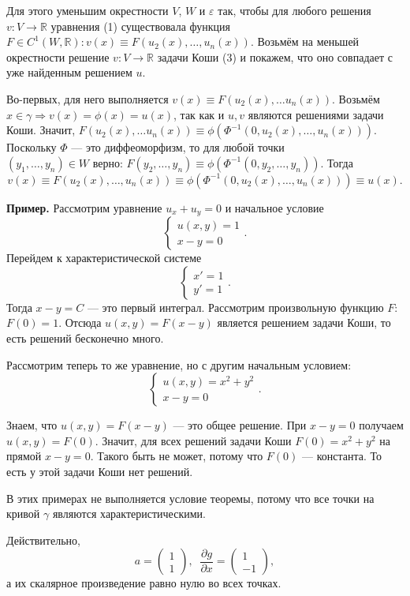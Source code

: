 Для этого уменьшим окрестности $V$, $W$ и $\varepsilon$ так, чтобы для любого решения $v \colon V \to \mathbb{R}$ уравнения (1) существовала функция $F \in C^1(W, \mathbb{R}) : v(x) \equiv F(u_2(x), \dots, u_n(x))$.
Возьмём на меньшей окрестности решение $v \colon V \to \mathbb{R}$ задачи Коши (3) и покажем, что оно совпадает с уже найденным решением $u$.

Во-первых, для него выполняется $v(x) \equiv F(u_2(x), \dots u_n(x))$. Возьмём $x \in \gamma \Rightarrow v(x) = \phi(x) = u(x)$, так как и $u, v$ являются решениями задачи Коши. Значит, $F(u_2(x), \dots u_n(x)) \equiv \phi(\Phi^{-1}(0, u_2(x), \dots, u_n(x)))$.
Поскольку $\Phi$ --- это диффеоморфизм, то для любой точки\\$(y_1, \dots, y_n) \in W$ верно: $F(y_2, \dots, y_n) \equiv \phi(\Phi^{-1}(0, y_2, \dots, y_n)).$
Тогда $$v(x) \equiv F(u_2(x), \dots, u_n(x)) \equiv \phi(\Phi^{-1}(0, u_2(x), \dots, u_n(x))) \equiv u(x).$$

\QED

\textbf{Пример.} Рассмотрим уравнение $u_x + u_y = 0$ и начальное условие
$$
\begin{cases}
  u(x, y) = 1\\
  x-y = 0
\end{cases}.
$$
Перейдем к характеристической системе 
$$
 \begin{cases}
    x' = 1\\
    y' = 1
 \end{cases}.
$$
Тогда $x - y = C$ --- это первый интеграл. Рассмотрим произвольную функцию $F$: $F(0) = 1$.
Отсюда $u(x, y) = F(x-y)$ является решением задачи Коши, то есть решений бесконечно много.

Рассмотрим теперь то же уравнение, но с другим начальным условием:
$$
\begin{cases}
   u(x, y) = x^2+y^2\\
   x-y = 0
\end{cases}.
$$

Знаем, что $u(x, y) = F(x-y)$ --- это общее решение. При $x-y = 0$ получаем $u(x, y) = F(0)$. Значит, для всех решений задачи Коши $F(0) = x^2+y^2$ на прямой $x-y = 0$. Такого быть не может, потому что $F(0)$ --- константа. То есть у этой задачи Коши нет решений. 

В этих примерах не выполняется условие теоремы, потому что все точки на кривой $\gamma$ являются характеристическими.

Действительно,
$$
a =
\begin{pmatrix}
1\\
1
\end{pmatrix},\;\;
\frac{\partial g}{\partial x} =
\begin{pmatrix}
1\\
-1
\end{pmatrix},
$$
а их скалярное произведение равно нулю во всех точках.